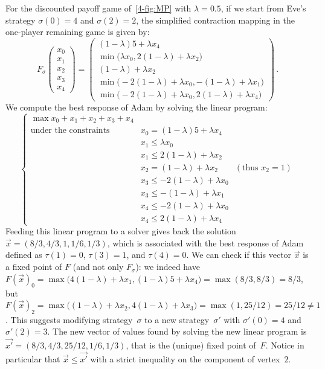 For the discounted payoff game of~\cref{4-fig:MP} with $\lambda=0.5$,
if we start from Eve's strategy $\sigma(0)=4$ and $\sigma(2)=2$, the
simplified contraction mapping in the one-player remaining game is
given by:
\[F_\sigma\left(
  \begin{array}{c}
    x_0\\x_1\\x_2\\x_3\\x_4
  \end{array}\right) =
  \left(
    \begin{array}{c}
      (1-\lambda)5+\lambda x_4\\
      \min\big(\lambda x_0, 2(1-\lambda)+\lambda x_2\big)\\
      (1-\lambda)+\lambda x_2\\
      \min\big(-2(1-\lambda)+\lambda x_0, -(1-\lambda)+\lambda x_1\big)\\
      \min\big(-2(1-\lambda)+\lambda x_0, 2(1-\lambda)+\lambda x_4\big)
    \end{array}
  \right)\,.\] We compute the best response of Adam by solving the
linear program:
\[\begin{cases}
    \max x_0+x_1+x_2+x_3+x_4 \\
    \text{under the constraints } & x_0=(1-\lambda)5+\lambda
    x_4 \\
    & x_1\leq \lambda x_0 \\
    & x_1\leq 2(1-\lambda)+\lambda x_2\\
    & x_2 = (1-\lambda)+\lambda x_2 \qquad (\text{thus } x_2=1) \\
    & x_3\leq -2(1-\lambda)+\lambda x_0\\
    & x_3 \leq -(1-\lambda)+\lambda x_1 \\
    & x_4\leq -2(1-\lambda)+\lambda x_0\\
    & x_4\leq 2(1-\lambda)+\lambda x_4
  \end{cases}\] Feeding this linear program to a solver gives back the
solution $\vec x=(8/3,4/3,1,1/6,\allowbreak 1/3)$, which is associated
with the best response of Adam defined as $\tau(1)=0$, $\tau(3)=1$,
and $\tau(4)=0$. We can check if this vector $\vec x$ is a fixed point
of $F$ (and not only $F_\sigma$): we indeed have
$F(\vec x)_0=\max\big(4(1-\lambda)+\lambda x_1, (1-\lambda)5+\lambda
x_4\big)= \max(8/3,8/3)= 8/3$, but
$F(\vec x)_2=\max\big((1-\lambda)+\lambda x_2, 4(1-\lambda)+\lambda
x_3\big) = \max(1,25/12)=25/12\neq 1$. This suggests modifying
strategy~$\sigma$ to a new strategy~$\sigma'$ with $\sigma'(0)=4$ and
$\sigma'(2)=3$. The new vector of values found by solving the new
linear program is $\vec{x'}=(8/3,4/3,25/12,1/6,1/3)$, that is the
(unique) fixed point of~$F$. Notice in particular that
$\vec{x}\leq \vec{x'}$ with a strict inequality on the component of
vertex~$2$.


